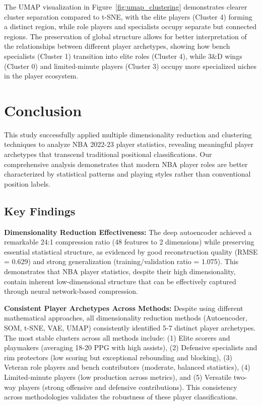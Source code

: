 \documentclass{article}
\begin{document}
The UMAP visualization in Figure~\ref{fig:umap_clustering} demonstrates clearer cluster separation compared to t-SNE, with the elite players (Cluster 4) forming a distinct region, while role players and specialists occupy separate but connected regions. The preservation of global structure allows for better interpretation of the relationships between different player archetypes, showing how bench specialists (Cluster 1) transition into elite roles (Cluster 4), while 3\&D wings (Cluster 0) and limited-minute players (Cluster 3) occupy more specialized niches in the player ecosystem.

\section{Conclusion}

This study successfully applied multiple dimensionality reduction and clustering techniques to analyze NBA 2022-23 player statistics, revealing meaningful player archetypes that transcend traditional positional classifications. Our comprehensive analysis demonstrates that modern NBA player roles are better characterized by statistical patterns and playing styles rather than conventional position labels.

\subsection{Key Findings}

\textbf{Dimensionality Reduction Effectiveness:} The deep autoencoder achieved a remarkable 24:1 compression ratio (48 features to 2 dimensions) while preserving essential statistical structure, as evidenced by good reconstruction quality (RMSE = 0.629) and strong generalization (training/validation ratio = 1.075). This demonstrates that NBA player statistics, despite their high dimensionality, contain inherent low-dimensional structure that can be effectively captured through neural network-based compression.

\textbf{Consistent Player Archetypes Across Methods:} Despite using different mathematical approaches, all dimensionality reduction methods (Autoencoder, SOM, t-SNE, VAE, UMAP) consistently identified 5-7 distinct player archetypes. The most stable clusters across all methods include: (1) Elite scorers and playmakers (averaging 18-20 PPG with high assists), (2) Defensive specialists and rim protectors (low scoring but exceptional rebounding and blocking), (3) Veteran role players and bench contributors (moderate, balanced statistics), (4) Limited-minute players (low production across metrics), and (5) Versatile two-way players (strong offensive and defensive contributions). This consistency across methodologies validates the robustness of these player classifications.
\end{document}
